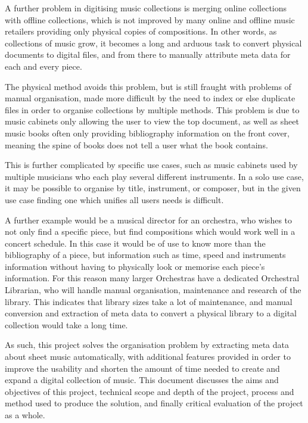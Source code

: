 A further problem in digitising music collections is merging online collections with offline collections, which is not improved by many online and offline music retailers providing only physical copies of compositions\parencite{MusicRoom}. In other words, as collections of music grow, it becomes a long and arduous task to convert physical documents to digital files, and from there to manually attribute meta data for each and every piece.

The physical method avoids this problem, but is still fraught with problems of manual organisation, made more difficult by the need to index or else duplicate files in order to organise collections by multiple methods. This problem is due to music cabinets only allowing the user to view the top document, as well as sheet music books often only providing bibliography information on the front cover, meaning the spine of books does not tell a user what the book contains\parencite{SheetMusicRant}.

This is further complicated by specific use cases, such as music cabinets used by multiple musicians who each play several different instruments. In a solo use case, it may be possible to organise by title, instrument, or composer, but in the given use case finding one which unifies all users needs is difficult.

A further example would be a musical director for an orchestra, who wishes to not only find a specific piece, but find compositions which would work well in a concert schedule. In this case it would be of use to know more than the bibliography of a piece, but information such as time, speed and instruments information without having to physically look or memorise each piece's information. For this reason many larger Orchestras have a dedicated Orchestral Librarian\parencite{MusicLibrarian}, who will handle manual organisation, maintenance and research of the library. This indicates that library sizes take a lot of maintenance, and manual conversion and extraction of meta data to convert a physical library to a digital collection would take a long time.

As such, this project solves the organisation problem by extracting meta data about sheet music automatically, with additional features provided in order to improve the usability and shorten the amount of time needed to create and expand a digital collection of music.
This document discusses the aims and objectives of this project, technical scope and depth of the project, process and method used to produce the solution, and finally critical evaluation of the project as a whole.
\pagebreak
